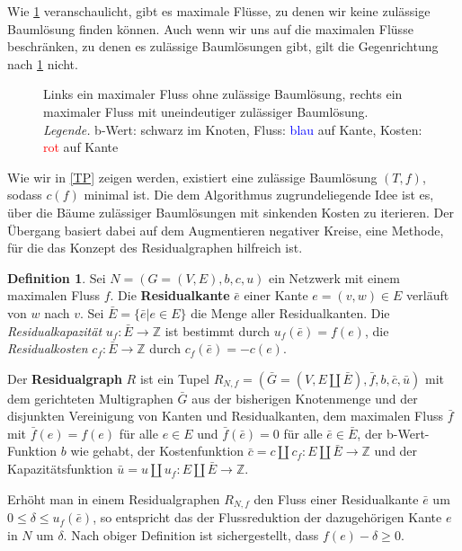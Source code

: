 \documentclass[a4paper,twoside,ngerman]{report}
\theoremstyle{plain}
\theoremstyle{definition}
\newtheorem{defn}[thm]{Definition}
\begin{document}
Wie \cref{fig:BL} veranschaulicht, gibt es maximale Flüsse, zu denen wir keine zulässige Baumlösung finden können. Auch wenn wir uns auf die maximalen Flüsse beschränken, zu denen es zulässige Baumlösungen gibt, gilt die Gegenrichtung nach \cref{fig:BL} nicht.

\begin{figure}[!h]\centering

\caption{Links ein maximaler Fluss ohne zulässige Baumlösung, rechts ein maximaler Fluss mit uneindeutiger zulässiger Baumlösung.\protect\\
	\protect\textit{Legende.} b-Wert: schwarz im Knoten, Fluss: \protect\textcolor{blue}{blau} auf Kante, Kosten: \protect\textcolor{red}{rot} auf Kante}
\label{fig:BL}
\end{figure}	

Wie wir in \cref{TP} zeigen werden, existiert eine zulässige Baumlösung $(T,f)$, sodass $c(f)$ minimal ist. Die dem Algorithmus zugrundeliegende Idee ist es, über die Bäume zulässiger Baumlösungen mit sinkenden Kosten zu iterieren. Der Übergang basiert dabei auf dem Augmentieren negativer Kreise, eine Methode, für die das Konzept des Residualgraphen hilfreich ist.

\begin{defn}\label{defRes}Sei $N=(G=(V,E),b,c,u)$ ein Netzwerk mit einem maximalen Fluss $f$. Die \textbf{Residualkante} $\bar{e}$ einer Kante $e=(v,w)\in E$ verläuft von $w$ nach $v$. Sei $\bar{E}=\{\bar{e}|e\in E\}$ die Menge aller Residualkanten. Die \textit{Residualkapazität} $u_f:\bar{E}\rightarrow\mathbb{Z}$ ist bestimmt durch $u_f(\bar{e})=f(e)$, die \textit{Residualkosten} $c_f:\bar{E}\rightarrow\mathbb{Z}$ durch $c_f(\bar{e})=-c(e)$.

Der \textbf{Residualgraph} $R$ ist ein Tupel $R_{N,f}=(\bar{G}=(V,E\amalg\bar{E}),\bar{f},b,\bar{c},\bar{u})$ mit dem gerichteten Multigraphen $\bar{G}$ aus der bisherigen Knotenmenge und der disjunkten Vereinigung von Kanten und Residualkanten, dem maximalen Fluss $\bar{f}$ mit $\bar{f}(e)=f(e)$ für alle $e\in E$ und $\bar{f}(\bar{e})=0$ für alle $\bar{e}\in\bar{E}$, der b-Wert-Funktion $b$ wie gehabt, der Kostenfunktion $\bar{c}=c\amalg c_f:E\amalg\bar{E}\rightarrow\mathbb{Z}$ und der Kapazitätsfunktion $\bar{u}=u\amalg u_f:E\amalg\bar{E}\rightarrow\mathbb{Z}$. 
\end{defn}

Erhöht man in einem Residualgraphen $R_{N,f}$ den Fluss einer Residualkante $\bar{e}$ um $0\leq\delta\leq u_f(\bar{e})$, so entspricht das der Flussreduktion der dazugehörigen Kante $e$ in $N$ um $\delta$. Nach obiger Definition ist sichergestellt, dass $f(e)-\delta\geq0$.
\end{document}

